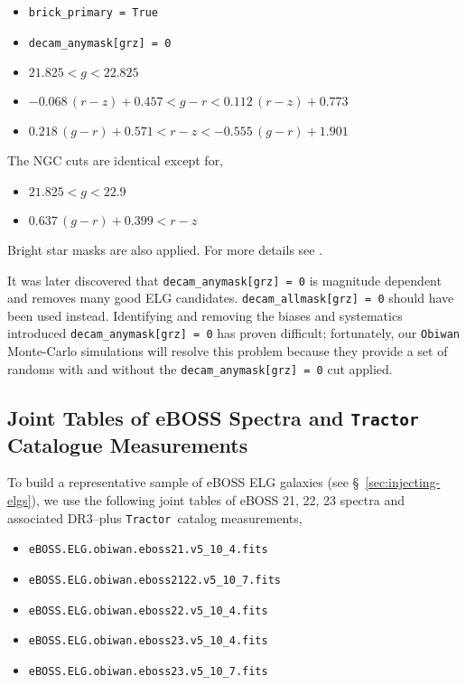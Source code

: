 \documentclass[a4paper,fleqn,usenatbib]{mnras}
\newcommand{\tractor}{{\tt Tractor}}
\newcommand{\obiwan}{{\tt Obiwan}}
\begin{document}
\begin{itemize}
\item \verb|brick_primary = True|
\item \verb|decam_anymask[grz] = 0|
\item $21.825 < g < 22.825$
\item $-0.068\, (r-z) + 0.457 < g-r < 0.112\, (r-z) + 0.773$
\item $0.218\, (g-r) + 0.571 < r-z < -0.555\, (g-r) + 1.901$
\end{itemize}

\noindent The NGC cuts are identical except for,

\begin{itemize}
\item $21.825 < g < 22.9$
\item $0.637\, (g-r) + 0.399 < r-z$
\end{itemize}

\noindent Bright star masks are also applied. For more details see \cite{anand17}.

It was later discovered that \verb|decam_anymask[grz] = 0| is magnitude dependent and removes many good ELG candidates. \verb|decam_allmask[grz] = 0| should have been used instead. Identifying and removing the biases and systematics introduced \verb|decam_anymask[grz] = 0| has proven difficult; fortunately, our \obiwan\, Monte-Carlo simulations will resolve this problem because they provide a set of randoms with and without the \verb|decam_anymask[grz] = 0| cut applied. 

\subsection{Joint Tables of eBOSS Spectra and \tractor\, Catalogue Measurements}
\label{sec:eboss-tractor}

To build a representative sample of eBOSS ELG galaxies (see \S\, \ref{sec:injecting-elgs}), we use the following joint tables of eBOSS 21, 22, 23 spectra and associated DR3--plus \tractor\, catalog measurements,

\begin{itemize}
\item \verb|eBOSS.ELG.obiwan.eboss21.v5_10_4.fits|
\item \verb|eBOSS.ELG.obiwan.eboss2122.v5_10_7.fits| 
\item \verb|eBOSS.ELG.obiwan.eboss22.v5_10_4.fits|
\item \verb|eBOSS.ELG.obiwan.eboss23.v5_10_4.fits|
\item \verb|eBOSS.ELG.obiwan.eboss23.v5_10_7.fits|
\end{itemize}
\end{document}
